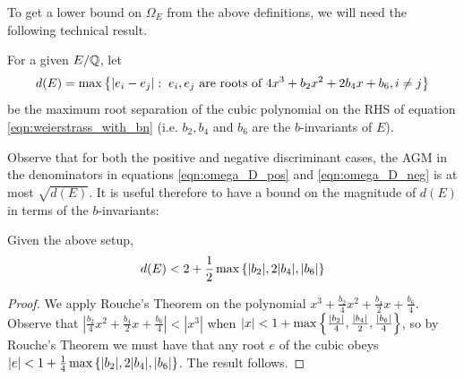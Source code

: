 \documentclass[10pt]{article}
\begin{document}
To get a lower bound on $\Omega_E$ from the above definitions, we will need the following technical result.
\begin{definition}
For a given $E/\mathbb{Q}$, let 
\begin{equation}
d(E) = \max\left\{|e_i - e_j|: \; e_i,e_j \text{ are roots of }4x^3 + b_2  x^2 + 2 b_4 x + b_6, i\ne j\right\}
\end{equation}
be the maximum root separation of the cubic polynomial on the RHS of equation \ref{eqn:weierstrass_with_bn}
(i.e. $b_2, b_4$ and $b_6$ are the $b$-invariants of $E$).
\end{definition}
Observe that for both the positive and negative discriminant cases, the AGM in the denominators in equations \ref{eqn:omega_D_pos} and \ref{eqn:omega_D_neg} is at most $\sqrt{d(E)}$. It is useful therefore to have a bound on the magnitude of $d(E)$ in terms of the $b$-invariants:
\begin{lemma}\label{lem:root_separation_bound}
Given the above setup,
\begin{equation}
d(E) < 2+\frac{1}{2}\max\left\{|b_2|,2|b_4|,|b_6|\right\}
\end{equation}
\end{lemma}
\begin{proof}
We apply Rouche's Theorem on the polynomial $x^3 + \frac{b_2}{4} x^2 + \frac{b_4}{2} x + \frac{b_6}{4}$. Observe that $|\frac{b_2}{4} x^2 + \frac{b_4}{2} x + \frac{b_6}{4}| < |x^3|$ when $|x| < 1+\max\left\{\frac{|b_2|}{4},\frac{|b_4|}{2},\frac{|b_6|}{4}\right\}$, so by Rouche's Theorem we must have that any root $e$ of the cubic obeys $|e| <  1+\frac{1}{4}\max\left\{|b_2|,2|b_4|,|b_6|\right\}$. The result follows.
\end{proof}
\end{document}
